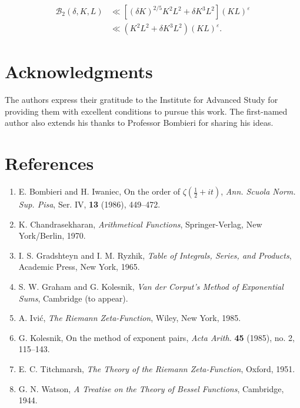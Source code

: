 \documentclass[10pt]{article}
\begin{document}
$$
\begin{aligned}
\mathscr{B}_{2}(\delta, K, L) & \ll\left[(\delta K)^{2 / 5} K^{2} L^{2}+\delta K^{3} L^{2}\right](K L)^{\varepsilon} \\
& \ll\left(K^{2}L^{2}+\delta K^{3} L^{2}\right)(K L)^{\varepsilon} .
\end{aligned}
$$

\section*{Acknowledgments}
The authors express their gratitude to the Institute for Advanced Study for providing them with excellent conditions to pursue this work. The first-named author also extends his thanks to Professor Bombieri for sharing his ideas.

\section*{References}
\begin{enumerate}
  \item E. Bombieri and H. Iwaniec, On the order of $\zeta(\tfrac12+it)$, \textit{Ann. Scuola Norm. Sup. Pisa}, Ser. IV, \textbf{13} (1986), 449--472.
  \item K. Chandrasekharan, \textit{Arithmetical Functions}, Springer-Verlag, New York/Berlin, 1970.
  \item I. S. Gradshteyn and I. M. Ryzhik, \textit{Table of Integrals, Series, and Products}, Academic Press, New York, 1965.
  \item S. W. Graham and G. Kolesnik, \textit{Van der Corput's Method of Exponential Sums}, Cambridge (to appear).
  \item A. Ivić, \textit{The Riemann Zeta-Function}, Wiley, New York, 1985.
  \item G. Kolesnik, On the method of exponent pairs, \textit{Acta Arith.} \textbf{45} (1985), no. 2, 115--143.
  \item E. C. Titchmarsh, \textit{The Theory of the Riemann Zeta-Function}, Oxford, 1951.
  \item G. N. Watson, \textit{A Treatise on the Theory of Bessel Functions}, Cambridge, 1944.
\end{enumerate}
\end{document}

